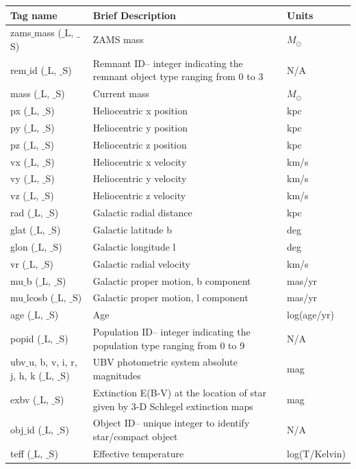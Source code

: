 \documentclass{scrartcl}
\begin{document}
\begin{table}[h]
\centering
{}
\begin{tabular}{ l | p{6.5cm} | p{3cm} }
    \textbf{Tag name} & \textbf{Brief Description} & \textbf{Units}  \\
    \hline
    zams$\_$mass ($\_$L, $\_$S) & ZAMS mass & $M_\odot$ \\
    rem$\_$id ($\_$L, $\_$S) & Remnant ID-- integer indicating the remnant object type ranging from 0 to 3 & N/A \\
    mass ($\_$L, $\_$S) & Current mass & $M_\odot$ \\
    px ($\_$L, $\_$S) & Heliocentric x position & kpc \\
    py ($\_$L, $\_$S) & Heliocentric y position & kpc \\
    pz ($\_$L, $\_$S) & Heliocentric z position & kpc \\
    vx ($\_$L, $\_$S) & Heliocentric x velocity & km/s \\
    vy ($\_$L, $\_$S) & Heliocentric y velocity & km/s \\
    vz ($\_$L, $\_$S) & Heliocentric z velocity & km/s \\
    rad ($\_$L, $\_$S) & Galactic radial distance & kpc \\
    glat ($\_$L, $\_$S) & Galactic latitude b & deg \\
    glon ($\_$L, $\_$S) & Galactic longitude l & deg \\
    vr ($\_$L, $\_$S) & Galactic radial velocity & km/s \\
    mu$\_$b ($\_$L, $\_$S) & Galactic proper motion, b component & mas/yr \\
    mu$\_$lcosb ($\_$L, $\_$S) & Galactic proper motion, l component & mas/yr \\
    age ($\_$L, $\_$S) & Age & log(age/yr) \\
    popid ($\_$L, $\_$S) & Population ID-- integer indicating the population type ranging from 0 to 9 & N/A \\
    ubv$\_$u, b, v, i, r, j, h, k ($\_$L, $\_$S) & UBV photometric system absolute magnitudes & mag \\
    exbv ($\_$L, $\_$S) & Extinction E(B-V) at the location of star given by 3-D Schlegel extinction maps & mag \\
    obj$\_$id ($\_$L, $\_$S) & Object ID-- unique integer to identify star/compact object & N/A \\
    teff ($\_$L, $\_$S) & Effective temperature & log(T/Kelvin) \\

\end{tabular}
\end{table}
\end{document}
